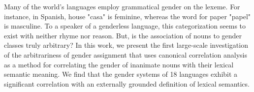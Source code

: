 Many of the world’s languages employ grammatical gender on the lexeme. For instance, in Spanish, house "casa" is feminine, whereas the word for paper "papel" is masculine. To a speaker of a genderless language, this categorization seems to exist with neither rhyme nor reason. But, is the association of nouns to gender classes truly arbitrary? In this work, we present the first large-scale investigation of the arbitrariness of gender assignment that uses canonical correlation analysis as a method for correlating the gender of inanimate nouns with their lexical semantic meaning. We find that the gender systems of 18 languages exhibit a significant correlation with an externally grounded definition of lexical semantics.